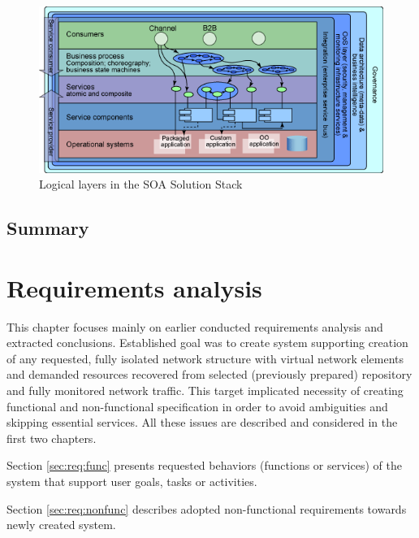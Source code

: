 \documentclass[11pt]{book}
\begin{document}
        \begin{figure}[H]
          \begin{center}
            \includegraphics[scale=.5]{img/ctx/soa-stack.png}
          \end{center}

          \caption{Logical layers in the SOA Solution Stack}
          \label{fig:ctx:soa-stack}
        \end{figure}


    \section*{Summary}


  \chapter{Requirements analysis}


    This chapter focuses mainly on earlier conducted requirements analysis and extracted conclusions. Established goal
    was to create system supporting creation of any requested, fully isolated network structure with virtual network
    elements and demanded resources recovered from selected (previously prepared) repository and fully monitored network
    traffic. This target implicated necessity of creating functional and non-functional specification in order to avoid
    ambiguities and skipping essential services. All these issues are described and considered in the first two
    chapters.

    Section \ref{sec:req:func} presents requested behaviors (functions or services) of the system that support user
    goals, tasks or activities.

    Section \ref{sec:req:nonfunc} describes adopted non-functional requirements towards newly created system.
\end{document}
